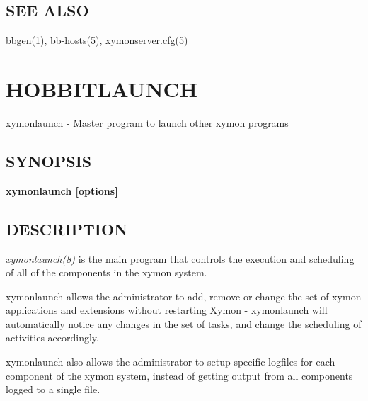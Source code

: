 \subsection{SEE ALSO}
bbgen(1), bb-hosts(5), xymonserver.cfg(5) 

 
%
%
\newpage
\section{HOBBITLAUNCH}
 xymonlaunch - Master program to launch other xymon programs 

 
\subsection{SYNOPSIS}
\textbf{xymonlaunch [options]}


 
\subsection{DESCRIPTION}
\emph{xymonlaunch(8)} is the main program that controls the execution
and scheduling of all of the components in the xymon system. 


  xymonlaunch allows the administrator to add, remove or change the
  set of xymon applications and extensions without restarting Xymon
  - xymonlaunch will automatically notice any changes in the set of
  tasks, and change the scheduling of activities accordingly. 



  xymonlaunch also allows the administrator to setup specific
  logfiles for each component of the xymon system, instead of getting
  output from all components logged to a single file. 



 
